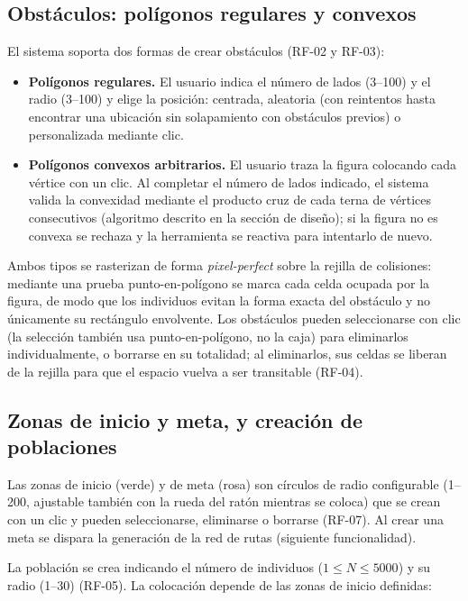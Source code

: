 \documentclass[12pt,a4paper]{article}
\begin{document}
\subsection{Obstáculos: polígonos regulares y convexos}

El sistema soporta dos formas de crear obstáculos (RF-02 y RF-03):

\begin{itemize}
    \item \textbf{Polígonos regulares.} El usuario indica el número de lados (3--100) y el radio (3--100) y elige la posición: centrada, aleatoria (con reintentos hasta encontrar una ubicación sin solapamiento con obstáculos previos) o personalizada mediante clic.
    \item \textbf{Polígonos convexos arbitrarios.} El usuario traza la figura colocando cada vértice con un clic. Al completar el número de lados indicado, el sistema valida la convexidad mediante el producto cruz de cada terna de vértices consecutivos (algoritmo descrito en la sección de diseño); si la figura no es convexa se rechaza y la herramienta se reactiva para intentarlo de nuevo.
\end{itemize}

Ambos tipos se rasterizan de forma \emph{pixel-perfect} sobre la rejilla de colisiones: mediante una prueba punto-en-polígono se marca cada celda ocupada por la figura, de modo que los individuos evitan la forma exacta del obstáculo y no únicamente su rectángulo envolvente. Los obstáculos pueden seleccionarse con clic (la selección también usa punto-en-polígono, no la caja) para eliminarlos individualmente, o borrarse en su totalidad; al eliminarlos, sus celdas se liberan de la rejilla para que el espacio vuelva a ser transitable (RF-04).

\subsection{Zonas de inicio y meta, y creación de poblaciones}

Las zonas de inicio (verde) y de meta (rosa) son círculos de radio configurable (1--200, ajustable también con la rueda del ratón mientras se coloca) que se crean con un clic y pueden seleccionarse, eliminarse o borrarse (RF-07). Al crear una meta se dispara la generación de la red de rutas (siguiente funcionalidad).

La población se crea indicando el número de individuos ($1 \le N \le 5000$) y su radio (1--30) (RF-05). La colocación depende de las zonas de inicio definidas:
\end{document}
